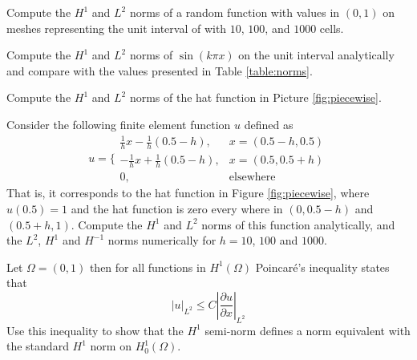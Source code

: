 \begin{exercise}
Compute the $H^1$ and $L^2$ norms of a random function with values
in $(0,1)$ on meshes representing the unit interval of with $10$, $100$, and $1000$ cells.   
\end{exercise}

\begin{exercise}
Compute the $H^1$ and $L^2$ norms of  $\sin( k \pi x)$ on the unit interval analytically 
and compare with the values presented in Table \ref{table:norms}.   
\end{exercise}

\begin{exercise}
\label{ex:piecewise}
Compute the $H^1$ and $L^2$ norms of  the hat function in Picture \ref{fig:piecewise}.   
\end{exercise}



\begin{exercise}
\label{ex:hat2}
Consider the following finite element function $u$ defined
as  
\[
u = \Bigg\{ 
\begin{array}{ll} \frac{1}{h} x - \frac{1}{h} (0.5 - h), & x=(0.5-h,0.5) \\  
              -\frac{1}{h} x + \frac{1}{h} (0.5 - h),  & x=(0.5,0.5 + h) \\  
                0, & \mbox{elsewhere}  
\end{array}
\]
That is, it corresponds to the hat function in Figure \ref{fig:piecewise}, where
$u(0.5)=1$ and the hat function is zero every where in $(0,0.5-h)$ and  $(0.5+h, 1)$.  
Compute the $H^1$ and $L^2$ norms of this function analytically, and the 
$L^2$, $H^1$ and $H^{-1}$ norms numerically for $h=10$, $100$ and $1000$.    
\end{exercise}
\begin{exercise}
\label{ex:poincare}

Let $\Omega=(0,1)$ then  
for all functions in $H^1(\Omega)$
Poincar\'e's inequality states that
\[
|u|_{L^2} \le C  |\frac{\partial u}{\partial x}|_{L^2}   
\]
Use this inequality to show that the $H^1$ semi-norm defines 
a norm equivalent with the standard $H^1$ norm on $H^1_0(\Omega)$. 
\end{exercise}







